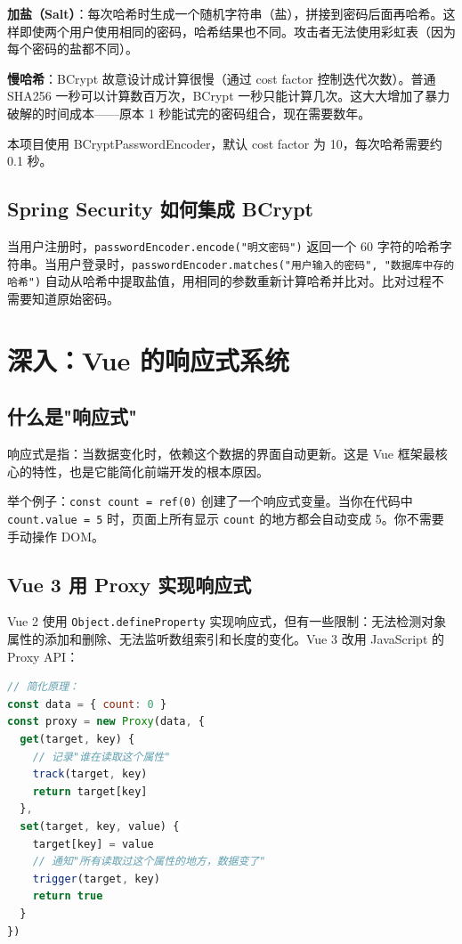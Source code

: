 \documentclass[12pt,a4paper]{ctexart}
\begin{document}
\textbf{加盐（Salt）}：每次哈希时生成一个随机字符串（盐），拼接到密码后面再哈希。这样即使两个用户使用相同的密码，哈希结果也不同。攻击者无法使用彩虹表（因为每个密码的盐都不同）。

\textbf{慢哈希}：BCrypt 故意设计成计算很慢（通过 cost factor 控制迭代次数）。普通 SHA256 一秒可以计算数百万次，BCrypt 一秒只能计算几次。这大大增加了暴力破解的时间成本——原本 1 秒能试完的密码组合，现在需要数年。

本项目使用 BCryptPasswordEncoder，默认 cost factor 为 10，每次哈希需要约 0.1 秒。

\subsection{Spring Security 如何集成 BCrypt}

当用户注册时，\texttt{passwordEncoder.encode("明文密码")} 返回一个 60 字符的哈希字符串。当用户登录时，\texttt{passwordEncoder.matches("用户输入的密码", "数据库中存的哈希")} 自动从哈希中提取盐值，用相同的参数重新计算哈希并比对。比对过程不需要知道原始密码。

\section{深入：Vue 的响应式系统}

\subsection{什么是"响应式"}

响应式是指：当数据变化时，依赖这个数据的界面自动更新。这是 Vue 框架最核心的特性，也是它能简化前端开发的根本原因。

举个例子：\texttt{const count = ref(0)} 创建了一个响应式变量。当你在代码中 \texttt{count.value = 5} 时，页面上所有显示 \texttt{count} 的地方都会自动变成 5。你不需要手动操作 DOM。

\subsection{Vue 3 用 Proxy 实现响应式}

Vue 2 使用 \texttt{Object.defineProperty} 实现响应式，但有一些限制：无法检测对象属性的添加和删除、无法监听数组索引和长度的变化。Vue 3 改用 JavaScript 的 Proxy API：

\begin{lstlisting}[language=JavaScript]
// 简化原理：
const data = { count: 0 }
const proxy = new Proxy(data, {
  get(target, key) {
    // 记录"谁在读取这个属性"
    track(target, key)
    return target[key]
  },
  set(target, key, value) {
    target[key] = value
    // 通知"所有读取过这个属性的地方，数据变了"
    trigger(target, key)
    return true
  }
})
\end{lstlisting}
\end{document}
